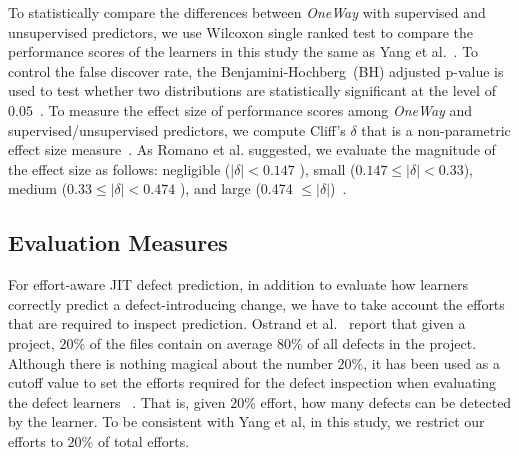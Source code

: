 \documentclass[sigconf]{acmart}
\theoremstyle{break}
\begin{document}
To statistically compare the differences between {\it OneWay} 
with supervised and unsupervised predictors,
we use 
Wilcoxon single ranked test to compare
the performance scores of the learners in this study the same as Yang et al.~\cite{yang2016effort}.
To control the false discover rate, the Benjamini-Hochberg~(BH) adjusted p-value 
is used to test whether two distributions are statistically significant
at the level of $0.05$~\cite{benjamini1995controlling, yang2016effort}. 
To measure the effect size of performance scores among {\it OneWay} and supervised/unsupervised predictors,
we compute Cliff's $\delta$ that is a non-parametric effect size measure~\cite{romano2006exploring}.
As Romano et al. suggested, we evaluate the magnitude of the effect size as follows:
negligible ($|\delta|<0.147$ ), small ($ 0.147\leq|\delta|<0.33$), medium ($0.33\leq|\delta|<0.474$ ), and large (0.474 $\leq|\delta|$)~\cite{romano2006exploring}.


\subsection{Evaluation Measures}

For effort-aware JIT defect prediction, in addition to evaluate how learners correctly predict a defect-introducing change, we have to take account  the efforts that are required to inspect prediction. Ostrand et al.~\cite{ostrand2005predicting}
report that given a project, $20\%$ of the files contain on average $80\%$  of all defects in the project.
Although there is nothing magical about the number $20\%$, it has been used as a cutoff
value to set the efforts required for the defect inspection when evaluating the defect learners ~\cite{yang2016effort,kamei2013large,mende2010effort,monden2013assessing}.
That is, given $20\%$ effort, 
how many defects  can be detected by the learner.
To be consistent with Yang et al, in this study, we restrict our efforts to $20\%$ of total efforts.
\end{document}

